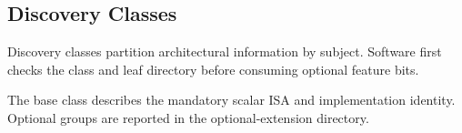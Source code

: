 \subsection{Discovery Classes}
Discovery classes partition architectural information by subject. Software first checks the class and
leaf directory before consuming optional feature bits.

The base class describes the mandatory scalar ISA and implementation identity. Optional groups are reported
in the optional-extension directory.
